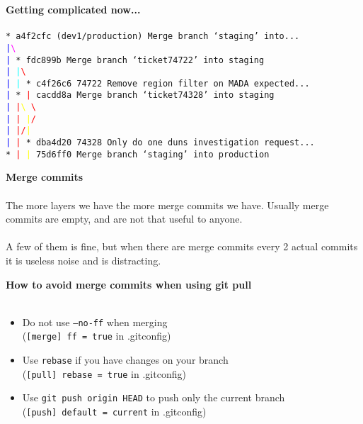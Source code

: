 \documentclass[landscape]{slides}
\begin{document}
\begin{slide}
\textbf{Getting complicated now...}\\
\\
\tt{*   a4f2cfc (dev1/production) Merge branch `staging' into...}\\
\tt{\textcolor{blue}{|}\textcolor{magenta}{\textbackslash}  }\\
\tt{\textcolor{blue}{|} *   fdc899b Merge branch `ticket74722' into staging}\\
\tt{\textcolor{blue}{|} \textcolor{cyan}{|}\textcolor{red}{\textbackslash}  }\\
\tt{\textcolor{blue}{|} \textcolor{cyan}{|} * c4f26c6 74722 Remove region filter on MADA expected...}\\
\tt{\textcolor{blue}{|} * \textcolor{red}{|}   cacdd8a Merge branch `ticket74328' into staging}\\
\tt{\textcolor{blue}{|} \textcolor{red}{|}\textcolor{yellow}{\textbackslash} \textcolor{red}{\textbackslash}  }\\
\tt{\textcolor{blue}{|} \textcolor{red}{|} \textcolor{yellow}{|}\textcolor{red}{/}  }\\
\tt{\textcolor{blue}{|} \textcolor{red}{|/}\textcolor{yellow}{|}   }\\
\tt{\textcolor{blue}{|} \textcolor{red}{|} * dba4d20 74328 Only do one duns investigation request...}\\
\tt{* \textcolor{red}{|} \textcolor{yellow}{|}   75d6ff0 Merge branch `staging' into production}\\
\end{slide}

\begin{slide}

\end{slide}

\begin{slide}
\textbf{Merge commits}\\
\\
The more layers we have the more merge commits we have.  Usually merge commits
are empty, and are not that useful to anyone.\\
\\
A few of them is fine, but when there are merge commits every 2 actual commits
it is useless noise and is distracting.
\end{slide}

\begin{slide}
\textbf{How to avoid merge commits when using git pull}\\
\\
\begin{itemize}
\item{Do not use {\tt --no-ff} when merging\\
({\tt [merge] ff = true} in .gitconfig)}
\item{Use {\tt rebase} if you have changes on your branch\\
({\tt [pull] rebase = true} in .gitconfig)}
\item{Use {\tt git push origin HEAD} to push only the current branch\\
({\tt [push] default = current} in .gitconfig)}
\end{itemize}
\end{slide}
\end{document}
